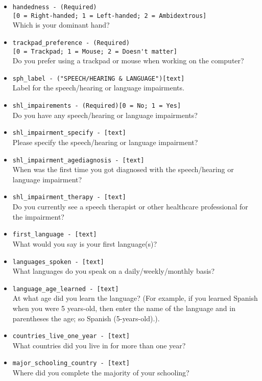 \begin{description}
\begin{addmargin}[0em]{0em}
\begin{addmargin}[1em]{0em}
\begin{itemize}
            \item \verb|handedness - (Required)|\\\verb|[0 = Right-handed; 1 = Left-handed; 2 = Ambidextrous]|\\Which is your dominant hand?
            \item \verb|trackpad_preference - (Required)|\\\verb|[0 = Trackpad; 1 = Mouse; 2 = Doesn't matter]|\\Do you prefer using a trackpad or mouse when working on the computer?
            \item \verb|sph_label - ("SPEECH/HEARING & LANGUAGE")[text]|\\Label for the speech/hearing or language impairments.
            \item \verb|shl_impairements - (Required)[0 = No; 1 = Yes]|\\Do you have any speech/hearing or language impairments?
            \item \verb|shl_impairment_specify - [text]|\\Please specify the speech/hearing or language impairment?
            \item \verb|shl_impairment_agediagnosis - [text]|\\When was the first time you got diagnosed with the speech/hearing or language impairment?
            \item \verb|shl_impairment_therapy - [text]|\\Do you currently see a speech therapist or other healthcare professional for the impairment?
            \item \verb|first_language - [text]|\\What would you say is your first language(s)?
            \item \verb|languages_spoken - [text]|\\What languages do you speak on a daily/weekly/monthly basis?
            \item \verb|language_age_learned - [text]|\\At what age did you learn the language? (For example, if you learned Spanish when you were 5 years-old, then enter the name of the language and in parentheses the age; so Spanish (5-years-old).).
            \item \verb|countries_live_one_year - [text]|\\What countries did you live in for more than one year?
            \item \verb|major_schooling_country - [text]|\\Where did you complete the majority of your schooling?

\end{itemize}
\end{addmargin}
\end{addmargin}
\end{description}
